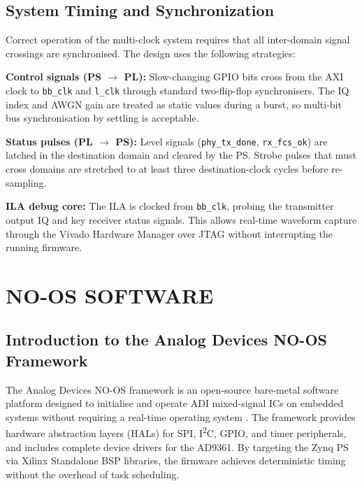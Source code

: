 \documentclass[12pt, a4paper, oneside]{report}
\begin{document}
\section{System Timing and Synchronization}

Correct operation of the multi-clock system requires that all inter-domain signal crossings are synchronised. The design uses the following strategies:

\textbf{Control signals (PS $\to$ PL):} Slow-changing GPIO bits cross from the AXI clock to \texttt{bb\_clk} and \texttt{l\_clk} through standard two-flip-flop synchronisers. The IQ index and AWGN gain are treated as static values during a burst, so multi-bit bus synchronisation by settling is acceptable.

\textbf{Status pulses (PL $\to$ PS):} Level signals (\texttt{phy\_tx\_done}, \texttt{rx\_fcs\_ok}) are latched in the destination domain and cleared by the PS. Strobe pulses that must cross domains are stretched to at least three destination-clock cycles before re-sampling.

\textbf{ILA debug core:} The ILA is clocked from \texttt{bb\_clk}, probing the transmitter output IQ and key receiver status signals. This allows real-time waveform capture through the Vivado Hardware Manager over JTAG without interrupting the running firmware.

\chapter{NO-OS SOFTWARE}

\section{Introduction to the Analog Devices NO-OS Framework}

The Analog Devices NO-OS framework is an open-source bare-metal software platform designed to initialise and operate ADI mixed-signal ICs on embedded systems without requiring a real-time operating system \cite{adi_noos}. The framework provides hardware abstraction layers (HALs) for SPI, I\textsuperscript{2}C, GPIO, and timer peripherals, and includes complete device drivers for the AD9361. By targeting the Zynq PS via Xilinx Standalone BSP libraries, the firmware achieves deterministic timing without the overhead of task scheduling.
\end{document}
